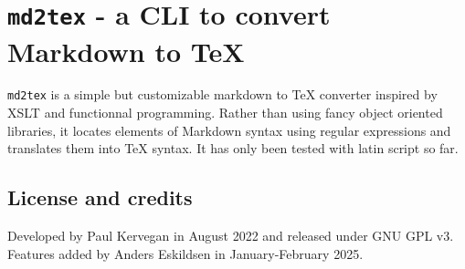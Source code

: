 \section{\texttt{md2tex} - a CLI to convert Markdown to TeX}

\texttt{md2tex} is a simple but customizable markdown to TeX converter inspired by XSLT and functionnal programming. Rather than using fancy object oriented libraries, it locates elements of Markdown syntax using regular expressions and translates them into TeX syntax. It has only been tested with latin script so far.
\subsection{License and credits}

Developed by Paul Kervegan in August 2022 and released under GNU GPL v3.
Features added by Anders Eskildsen in January-February 2025.